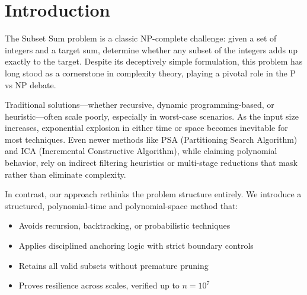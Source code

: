 \documentclass[11pt]{article}
\begin{document}
\vspace{1em}

\begin{center}
\noindent{}
\end{center}

\vspace{1em}

\section{Introduction}

The Subset Sum problem is a classic NP-complete challenge: given a set of integers and a target sum, determine whether any subset of the integers adds up exactly to the target. Despite its deceptively simple formulation, this problem has long stood as a cornerstone in complexity theory, playing a pivotal role in the P vs NP debate.

Traditional solutions—whether recursive, dynamic programming-based, or heuristic—often scale poorly, especially in worst-case scenarios. As the input size increases, exponential explosion in either time or space becomes inevitable for most techniques. Even newer methods like PSA (Partitioning Search Algorithm) and ICA (Incremental Constructive Algorithm), while claiming polynomial behavior, rely on indirect filtering heuristics or multi-stage reductions that mask rather than eliminate complexity.

In contrast, our approach rethinks the problem structure entirely. We introduce a structured, polynomial-time and polynomial-space method that:
\begin{itemize}
  \item Avoids recursion, backtracking, or probabilistic techniques
  \item Applies disciplined anchoring logic with strict boundary controls
  \item Retains all valid subsets without premature pruning
  \item Proves resilience across scales, verified up to $n = 10^7$
\end{itemize}
\end{document}
